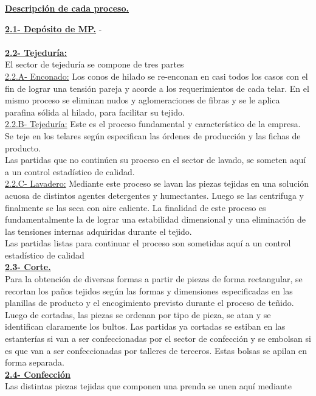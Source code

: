 \documentclass[a4paper,10pt,titlepage]{article}
\begin{document}
\begin{center}\textbf{\underline{Descripción de cada proceso.}}\end{center}
\textbf{\underline{2.1- Depósito de MP.}} 
 -\\ \\
\textbf{\underline{2.2- Tejeduría:}}\\
El sector de tejeduría se compone de tres partes\\
\underline{2.2.A- Enconado:} Los conos de hilado se re-enconan en casi todos los casos con
el fin de lograr una tensión pareja y acorde a los requerimientos de cada telar. En
el mismo proceso se eliminan nudos y aglomeraciones de fibras y se le aplica
parafina sólida al hilado, para facilitar su tejido.\\
\underline{2.2.B- Tejeduría:} Este es el proceso fundamental y característico de la empresa.
Se teje en los telares según especifican las órdenes de producción y las fichas de
producto.\\
Las partidas que no continúen su proceso en el sector de lavado, se someten aquí
a un control estadístico de calidad.\\
\underline{2.2.C- Lavadero:} Mediante este proceso se lavan las piezas tejidas en una solución
acuosa de distintos agentes detergentes y humectantes. Luego se las centrifuga y
finalmente se las seca con aire caliente. La finalidad de este proceso es
fundamentalmente la de lograr una estabilidad dimensional y una eliminación de
las tensiones internas adquiridas durante el tejido.\\
Las partidas listas para continuar el proceso son sometidas aquí a un control
estadístico de calidad\\
\textbf{\underline{2.3- Corte.}}\\
Para la obtención de diversas formas a partir de piezas de forma rectangular, se
recortan los paños tejidos según las formas y dimensiones especificadas en las
planillas de producto y el encogimiento previsto durante el proceso de teñido.
Luego de cortadas, las piezas se ordenan por tipo de pieza, se atan y se identifican
claramente los bultos. Las partidas ya cortadas se estiban en las estanterías si van
a ser confeccionadas por el sector de confección y se embolsan si es que van a ser
confeccionadas por talleres de terceros. Estas bolsas se apilan en forma separada.\\
\textbf{\underline{2.4- Confección}}\\
Las distintas piezas tejidas que componen una prenda se unen aquí mediante
\end{document}
